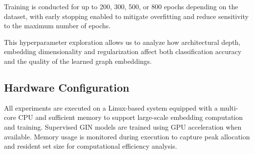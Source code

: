 Training is conducted for up to 200, 300, 500, or 800 epochs depending on the dataset, with early
stopping enabled to mitigate overfitting and reduce sensitivity to the maximum number of epochs.

This hyperparameter exploration allows us to analyze how architectural depth, embedding dimensionality 
and regularization affect both classification accuracy and the quality of the learned graph embeddings. 

\subsection{Hardware Configuration}
All experiments are executed on a Linux-based system equipped with a multi-core CPU and sufficient
memory to support large-scale embedding computation and training.
Supervised GIN models are trained using GPU acceleration when available.
Memory usage is monitored during execution to capture peak allocation and resident set size
for computational efficiency analysis.
